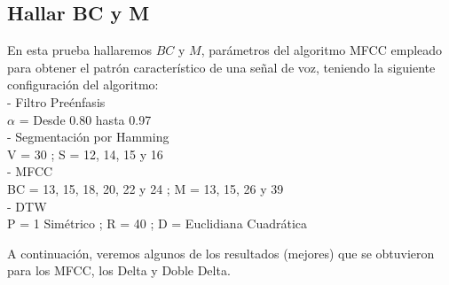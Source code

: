 \subsection{Hallar BC y M}
En esta prueba hallaremos $BC$ y $M$, parámetros del algoritmo MFCC empleado para obtener el patrón característico de una señal de voz, teniendo la siguiente configuración del algoritmo:\\
- Filtro Preénfasis \\
\hspace*{1cm} $\alpha$ = Desde 0.80 hasta 0.97 \\
- Segmentación por Hamming\\
\hspace*{1cm} V = 30 ; \qquad S = 12, 14, 15 y 16\\
- MFCC\\
\hspace*{1cm} BC = 13, 15, 18, 20, 22 y 24 ; \qquad M = 13, 15, 26 y 39\\
- DTW\\
\hspace*{1cm} P = 1 Simétrico ; \qquad R = 40 ; \qquad D = Euclidiana Cuadrática

\vskip 0.5cm
A continuación, veremos algunos de los resultados (mejores) que se obtuvieron para los MFCC, los Delta y Doble Delta.

